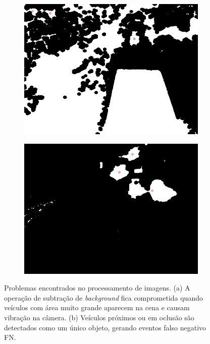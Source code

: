 \begin{figure}[ht]
  \begin{center}
    \begin{subfigure}[b]{.49\textwidth}
      \begin{center}
        \includegraphics[width=1\linewidth]{imgs/problema_veiculo_grande.png}
      \end{center}
      \caption{}
      \label{fig:problema_veiculo_grande}
    \end{subfigure}
    \begin{subfigure}[b]{.49\textwidth}
      \begin{center}
        \includegraphics[width=1\linewidth]{imgs/problema_veiculo_junto.png}
      \end{center}
      \caption{}
      \label{fig:problema_veiculo_junto}
    \end{subfigure}
  \end{center}
  \caption{Problemas encontrados no processamento de imagens. (a) A operação de subtração de \textit{background} fica comprometida quando veículos com área muito grande aparecem na cena e causam vibração na câmera. (b) Veículos próximos ou em oclusão são detectados como um único objeto, gerando eventos falso negativo FN.}
  \label{fig:problemas}
\end{figure}

